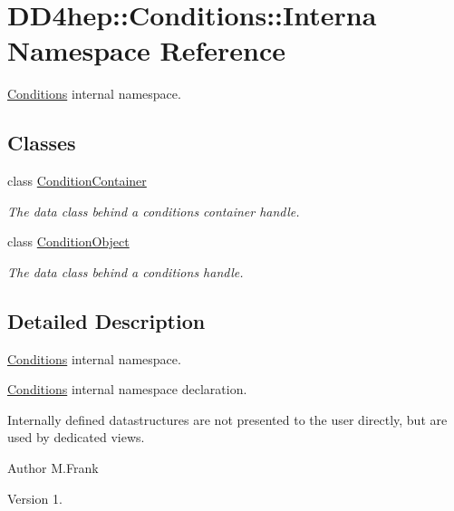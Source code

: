 \hypertarget{namespace_d_d4hep_1_1_conditions_1_1_interna}{}\section{D\+D4hep\+:\+:Conditions\+:\+:Interna Namespace Reference}
\label{namespace_d_d4hep_1_1_conditions_1_1_interna}


\hyperlink{namespace_d_d4hep_1_1_conditions}{Conditions} internal namespace.  


\subsection*{Classes}
\begin{DoxyCompactItemize}
\item 
class \hyperlink{class_d_d4hep_1_1_conditions_1_1_interna_1_1_condition_container}{Condition\+Container}
\begin{DoxyCompactList}\small\item\em The data class behind a conditions container handle. \end{DoxyCompactList}\item 
class \hyperlink{class_d_d4hep_1_1_conditions_1_1_interna_1_1_condition_object}{Condition\+Object}
\begin{DoxyCompactList}\small\item\em The data class behind a conditions handle. \end{DoxyCompactList}\end{DoxyCompactItemize}


\subsection{Detailed Description}
\hyperlink{namespace_d_d4hep_1_1_conditions}{Conditions} internal namespace. 

\hyperlink{namespace_d_d4hep_1_1_conditions}{Conditions} internal namespace declaration.

Internally defined datastructures are not presented to the user directly, but are used by dedicated views.

\begin{DoxyAuthor}{Author}
M.\+Frank 
\end{DoxyAuthor}
\begin{DoxyVersion}{Version}
1. 
\end{DoxyVersion}
